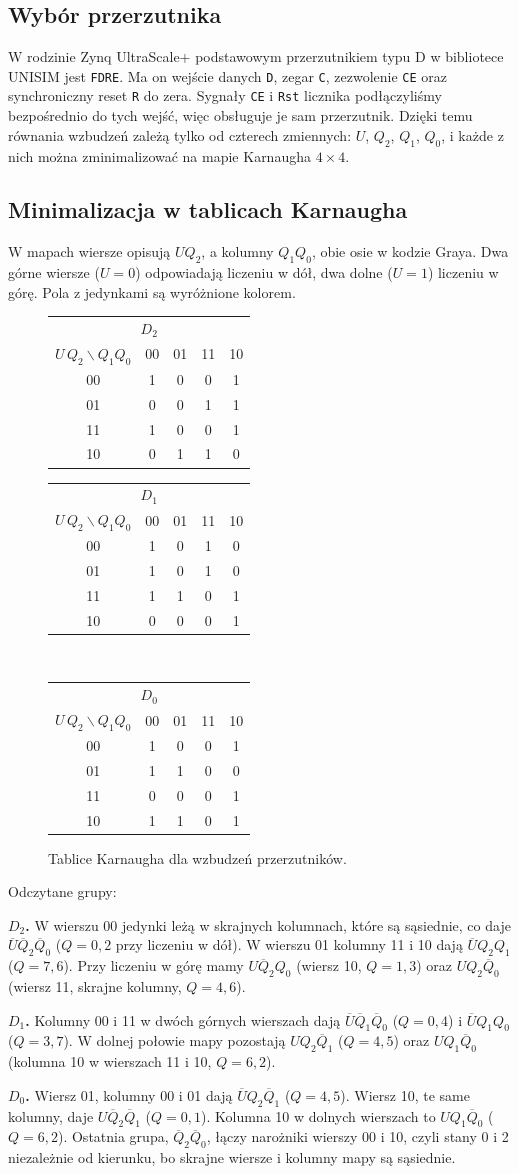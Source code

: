 \documentclass[11pt,a4paper]{article}
\newcommand{\nq}[1]{\overline{Q}_{#1}}
\newcommand{\nU}{\overline{U}}
\newcommand{\jj}{\cellcolor{pwr!18}1}
\newcommand{\kmap}[5]{%
  \begin{tabular}{c|cccc}
    \multicolumn{5}{c}{\textbf{#1}}\\[2pt]
    $U\,Q_2 \backslash Q_1Q_0$ & 00 & 01 & 11 & 10\\ \hline
    00 & #2\\
    01 & #3\\
    11 & #4\\
    10 & #5
  \end{tabular}}
\begin{document}
\subsection{Wybór przerzutnika}

W rodzinie Zynq UltraScale+ podstawowym przerzutnikiem typu D w bibliotece UNISIM jest \texttt{FDRE}. Ma on wejście danych \texttt{D}, zegar \texttt{C}, zezwolenie \texttt{CE} oraz synchroniczny reset \texttt{R} do zera. Sygnały \texttt{CE} i \texttt{Rst} licznika podłączyliśmy bezpośrednio do tych wejść, więc obsługuje je sam przerzutnik. Dzięki temu równania wzbudzeń zależą tylko od czterech zmiennych: $U$, $Q_2$, $Q_1$, $Q_0$, i każde z nich można zminimalizować na mapie Karnaugha $4 \times 4$.

\subsection{Minimalizacja w tablicach Karnaugha}

W mapach wiersze opisują $U Q_2$, a kolumny $Q_1Q_0$, obie osie w kodzie Graya. Dwa górne wiersze ($U = 0$) odpowiadają liczeniu w dół, dwa dolne ($U = 1$) liczeniu w górę. Pola z jedynkami są wyróżnione kolorem.

\begin{figure}[H]
\centering
\small
\kmap{$D_2$}{\jj&0&0&\jj}{0&0&\jj&\jj}{\jj&0&0&\jj}{0&\jj&\jj&0}
\hspace{1.5em}
\kmap{$D_1$}{\jj&0&\jj&0}{\jj&0&\jj&0}{\jj&\jj&0&\jj}{0&0&0&\jj}
\\[1.2em]
\kmap{$D_0$}{\jj&0&0&\jj}{\jj&\jj&0&0}{0&0&0&\jj}{\jj&\jj&0&\jj}
\caption{Tablice Karnaugha dla wzbudzeń przerzutników.}
\end{figure}

Odczytane grupy:

\textbf{$D_2$.} W wierszu 00 jedynki leżą w skrajnych kolumnach, które są sąsiednie, co daje $\nU\nq{2}\nq{0}$ ($Q = 0, 2$ przy liczeniu w dół). W wierszu 01 kolumny 11 i 10 dają $\nU Q_2 Q_1$ ($Q = 7, 6$). Przy liczeniu w górę mamy $U\nq{2}Q_0$ (wiersz 10, $Q = 1, 3$) oraz $U Q_2 \nq{0}$ (wiersz 11, skrajne kolumny, $Q = 4, 6$).

\textbf{$D_1$.} Kolumny 00 i 11 w dwóch górnych wierszach dają $\nU\nq{1}\nq{0}$ ($Q = 0, 4$) i $\nU Q_1 Q_0$ ($Q = 3, 7$). W dolnej połowie mapy pozostają $U Q_2 \nq{1}$ ($Q = 4, 5$) oraz $U Q_1 \nq{0}$ (kolumna 10 w wierszach 11 i 10, $Q = 6, 2$).

\textbf{$D_0$.} Wiersz 01, kolumny 00 i 01 dają $\nU Q_2 \nq{1}$ ($Q = 4, 5$). Wiersz 10, te same kolumny, daje $U \nq{2} \nq{1}$ ($Q = 0, 1$). Kolumna 10 w dolnych wierszach to $U Q_1 \nq{0}$ ($Q = 6, 2$). Ostatnia grupa, $\nq{2}\nq{0}$, łączy narożniki wierszy 00 i 10, czyli stany 0 i 2 niezależnie od kierunku, bo skrajne wiersze i kolumny mapy są sąsiednie.
\end{document}
